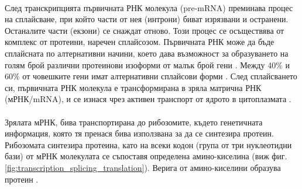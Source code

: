 \documentclass[pdftex,cyrillic,14pt,a4page,twoside,openright]{extreport}
\begin{document}
\paragraph{}
След транскрипцията първичната РНК молекула (pre-mRNA) преминава процес на сплайсване, при който части от нея (интрони) биват изрязвани и остранени. Останалите части (екзони) се снаждат отново. Този процес се осъществява от комплекс от протеини, наречен сплайсозом. Първичната РНК може да бъде сплайсната по алтернативни начини, което дава възможност за образуването на голям брой различни протеинови изоформи от малък брой гени \cite{stamm2005}. Между 40\% и 60\% от човешките гени имат алтернативни сплайсови форми \cite{modrek2002}. След сплайсването си, първичната РНК молекула е трансформирана в зряла матрична РНК (мРНК/mRNA), и се изнася чрез активен транспорт от ядрото в цитоплазмата \cite{siebrasse2012}.

\paragraph{}
Зрялата мРНК, бива транспортирана до рибозомите, където генетичната информация, която тя пренася бива използвана за да се синтезира протеин. Рибозомата синтезира протеина, като на всеки кодон (група от три нуклеотидни бази) от мРНК молекулата се съпоставя определена амино-киселина (виж фиг. \ref{fig:transcription_splicing_translation}). Верига от амино-киселини образува протеин \cite[стр. 412-420]{klug2014}.
\end{document}
